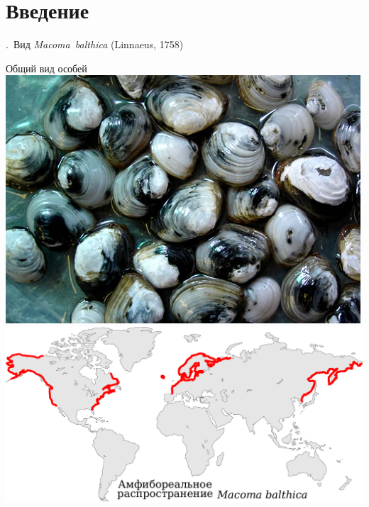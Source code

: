\documentclass[aspectratio=169, xcolor=table]{beamer}
\begin{document}
		\section{Введение}
\begin{frame}{\insertpagenumber.\ Вид {\it Macoma~balthica} (Linnaeus, 1758)}

{\scriptsize Общий вид особей}
			\includegraphics[width=.4\textwidth]{Baltic_macoma.jpg}	\includegraphics[width=.6\textwidth]{areal_line.pdf}


\end{frame}
\end{document}
